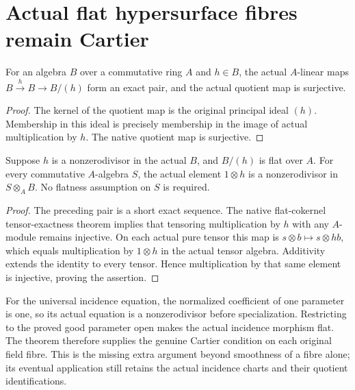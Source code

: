 \section{Actual flat hypersurface fibres remain Cartier}

\begin{lemma}\label{lem:kn-nadel-principal-quotient-exact}
\leanok
For an algebra $B$ over a commutative ring $A$ and $h\in B$, the actual
$A$-linear maps $B\xrightarrow{h}B\to B/(h)$ form an exact pair, and
the actual quotient map is surjective.
\end{lemma}
\begin{proof}
The kernel of the quotient map is the original principal ideal $(h)$.
Membership in this ideal is precisely membership in the image of actual
multiplication by $h$.  The native quotient map is surjective.
\end{proof}

\begin{theorem}\label{thm:kn-nadel-flat-principal-fibre-regular}
\leanok
{}
Suppose $h$ is a nonzerodivisor in the actual $B$, and $B/(h)$ is flat
over $A$.  For every commutative $A$-algebra $S$, the actual element
$1\otimes h$ is a nonzerodivisor in $S\otimes_A B$.
No flatness assumption on $S$ is required.
\end{theorem}
\begin{proof}
The preceding pair is a short exact sequence.  The native flat-cokernel
tensor-exactness theorem implies that tensoring multiplication by $h$
with any $A$-module remains injective.  On each actual pure tensor
this map is $s\otimes b\mapsto s\otimes hb$, which equals multiplication
by $1\otimes h$ in the actual tensor algebra.  Additivity extends the
identity to every tensor.  Hence multiplication by that same element
is injective, proving the assertion.
\end{proof}

For the universal incidence equation, the normalized coefficient of one
parameter is one, so its actual equation is a nonzerodivisor before
specialization.  Restricting to the proved good parameter open makes the
actual incidence morphism flat.  The theorem therefore supplies the
genuine Cartier condition on each original field fibre.  This is the
missing extra argument beyond smoothness of a fibre alone; its eventual
application still retains the actual incidence charts and their quotient
identifications.
